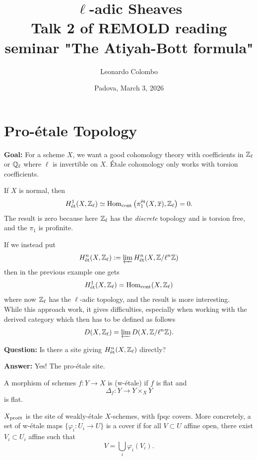 \documentclass[oneside]{amsart}
\title{\texorpdfstring{$\ell$-adic Sheaves}{l-adic Sheaves}\\
Talk 2 of REMOLD reading seminar "The Atiyah-Bott formula"}
\author{Leonardo Colombo}
\date{Padova, March 3, 2026}
\begin{document}
\maketitle

\section{Pro-\'etale Topology}

\textbf{Goal:} For a scheme $X$, we want a good cohomology theory with coefficients in
$\mathbb Z_\ell$ or $\mathbb Q_\ell$ where $\ell$ is invertible on $X$.
\'Etale cohomology only works with torsion coefficients.
\begin{example}
	If $X$ is normal, then
	\[
		H^{1}_{\mathrm{\acute{e}t}}(X,\mathbb Z_\ell) \simeq \operatorname{Hom}_{\mathrm{cont}}\left( \pi_1^{\mathrm{\acute{e}t}}(X,\overline{x}),\mathbb Z_\ell \right) = 0.
	\]
	The result is zero because here $\mathbb Z_\ell$ has the \textit{discrete} topology and is
	torsion free, and the $\pi_1$ is profinite.
\end{example}
If we instead put
\[
	H^{n}_{\mathrm{\acute{e}t}}(X,\mathbb Z_\ell) := \varprojlim H^{n}_{\mathrm{\acute{e}t}}(X,\mathbb Z /\ell^{n}\mathbb Z) \\
\]
then in the previous example one gets
\[
	H^{1}_{\mathrm{\acute{e}t}}(X,\mathbb Z_\ell)=\operatorname{Hom}_{\mathrm{cont}}(X,\mathbb Z_\ell)
\]
where now $\mathbb Z_\ell$ has the $\ell$-adic topology, and the result is more interesting.\\
While this approach work, it gives difficulties, especially when working with the derived
category which then has to be defined as follows
\[
	D(X,\mathbb Z_\ell) = \varprojlim D(X,\mathbb Z /\ell^{n}\mathbb Z).
\]

\textbf{Question:} Is there a site giving $H^{n}_{\mathrm{\acute{e}t}}(X,\mathbb Z_\ell)$ directly?

\textbf{Answer:} Yes! The pro-\'etale site.

\begin{definition}
	A morphism of schemes $f:Y\to X$ is  (w-étale) if $f$ is flat and
	\[
		\Delta_f:Y\to Y\times_X Y
	\]
	is flat.

	$X_{\mathrm{pro\acute{e}t}}$ is the site of weakly-\'etale $X$-schemes, with fpqc covers. More concretely,
	a set of w-étale maps	$\{\varphi_i:U_i\to U\}$ is a cover if for all $V\subset U$ affine
	open, there exist
	$V_i\subset U_i$ affine such that
	\[
		V = \bigcup_{i} \varphi_i(V_i).
	\]
\end{definition}
\end{document}
